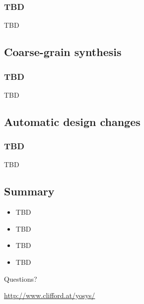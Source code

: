 \begin{frame}
\subsectionpage
\subsectionpagesuffix
\end{frame}

\subsubsection{TBD}

\begin{frame}{\subsubsecname}
TBD
\end{frame}


\subsection{Coarse-grain synthesis}

\begin{frame}
\subsectionpage
\subsectionpagesuffix
\end{frame}

\subsubsection{TBD}

\begin{frame}{\subsubsecname}
TBD
\end{frame}


\subsection{Automatic design changes}

\begin{frame}
\subsectionpage
\subsectionpagesuffix
\end{frame}

\subsubsection{TBD}

\begin{frame}{\subsubsecname}
TBD
\end{frame}


\subsection{Summary}

\begin{frame}{\subsecname}
\begin{itemize}
\item TBD
\item TBD
\item TBD
\item TBD
\end{itemize}

\bigskip
\bigskip
\begin{center}
Questions?
\end{center}

\bigskip
\bigskip
\begin{center}
\url{http://www.clifford.at/yosys/}
\end{center}
\end{frame}

